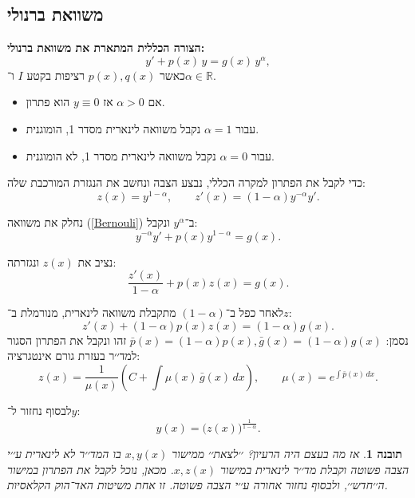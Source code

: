 \documentclass{article}
\numberwithin{equation}{section}
\newtheorem{insight}{תובנה}[section]
\begin{document}

\newpage
\subsection{משוואת ברנולי}

\textbf{הצורה הכללית המתארת את משוואת ברנולי:}
\begin{equation}\label{Bernouli}
y' + p(x)\,y = g(x)\,y^{\alpha}, 
\end{equation}
כאשר $p(x),q(x)$ רציפות בקטע $I$ ו־$\alpha \in \mathbb{R}$.

\begin{itemize}
  \item אם $\alpha>0$ אז $y\equiv 0$ הוא פתרון.
  \item עבור $\alpha=1$ נקבל משוואה לינארית מסדר 1, הומוגנית.
  \item עבור $\alpha=0$ נקבל משוואה לינארית מסדר 1, לא הומוגנית.
\end{itemize}


כדי לקבל את הפתרון למקרה הכללי, נבצע הצבה ונחשב את הנגזרת המורכבת שלה:
\[
z(x) = y^{1-\alpha}, \qquad z'(x) = (1-\alpha) y^{-\alpha} y'.
\]

נחלק את משוואה (\ref{Bernouli}) ב־$y^\alpha$ ונקבל:
\[
y^{-\alpha} y' + p(x) y^{1-\alpha} = g(x).
\]

נציב את $z(x)$ ונגזרתה:
\[
\frac{z'(x)}{1-\alpha} + p(x)z(x) = g(x).
\]

לאחר כפל ב־$(1-\alpha)$ מתקבלת משוואה לינארית, מנורמלת ב־$z$:
\begin{equation}
z'(x) + (1-\alpha)p(x)z(x) = (1-\alpha)g(x).
\end{equation}
נסמן: $\bar{p}(x)=(1-\alpha)p(x), \bar{g}(x)=(1-\alpha)g(x)$
זהו ונקבל את הפתרון הסגור למד׳׳ר בעזרת גורם אינטגרציה:
\begin{equation}
\boxed{z(x) = \frac{1}{\mu(x)} \left(C + \int \mu(x)\,\bar{g}(x)\,dx \right), 
\qquad 
\mu(x)=e^{\int \bar{p}(x)\,dx}}.
\end{equation}

לבסוף נחזור ל־$y$:
\begin{equation}
\boxed{y(x) = \Big(z(x)\Big)^{\tfrac{1}{1-\alpha}}}.
\end{equation}

\begin{insight}
אז מה בעצם היה הרעיון? ׳׳לצאת׳׳ ממישור $x,y(x)$ בו המד׳׳ר לא לינארית 
ע׳׳י הצבה פשוטה וקבלת מד׳׳ר לינארית במישור $x,z(x)$.  
מכאן, נוכל לקבל את הפתרון במישור ה׳׳חדש׳׳, ולבסוף נחזור אחורה ע׳׳י הצבה פשוטה.  
זו אחת משיטות האד־הוק הקלאסיות.
\end{insight}
\end{document}
